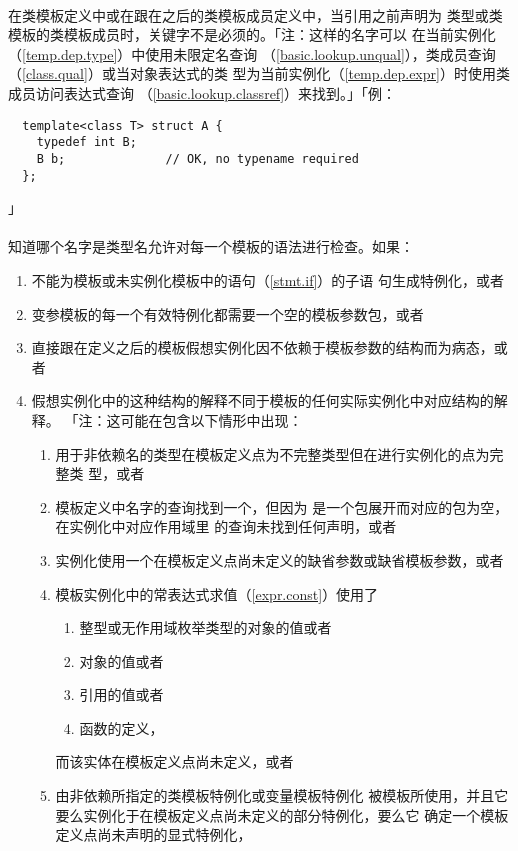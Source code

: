 \paragraph{}
在类模板定义中或在跟在之后的类模板成员定义中，当引用之前声明为
类型或类模板的类模板成员时，关键字不是必须的。「注：这样的名字可以
在当前实例化（\ref{temp.dep.type}）中使用未限定名查询
（\ref{basic.lookup.unqual}），类成员查询（\ref{class.qual}）或当对象表达式的类
型为当前实例化（\ref{temp.dep.expr}）时使用类成员访问表达式查询
（\ref{basic.lookup.classref}）来找到。」「例：
\begin{lstlisting}
  template<class T> struct A {
    typedef int B;
    B b;              // OK, no typename required
  };
\end{lstlisting}」

\paragraph{}
知道哪个名字是类型名允许对每一个模板的语法进行检查。如果：
\begin{enumerate}
  \item{不能为模板或未实例化模板中的语句（\ref{stmt.if}）的子语
    句生成特例化，或者}
  \item{变参模板的每一个有效特例化都需要一个空的模板参数包，或者}
  \item{直接跟在定义之后的模板假想实例化因不依赖于模板参数的结构而为病态，或者}
  \item{假想实例化中的这种结构的解释不同于模板的任何实际实例化中对应结构的解释。
    「注：这可能在包含以下情形中出现：
    \begin{enumerate}
      \item{用于非依赖名的类型在模板定义点为不完整类型但在进行实例化的点为完整类
        型，或者}
      \item{模板定义中名字的查询找到一个，但因为
        是一个包展开而对应的包为空，在实例化中对应作用域里
        的查询未找到任何声明，或者}
      \item{实例化使用一个在模板定义点尚未定义的缺省参数或缺省模板参数，或者}
      \item{模板实例化中的常表达式求值（\ref{expr.const}）使用了
        \begin{enumerate}
          \item{整型或无作用域枚举类型的对象的值或者}
          \item{对象的值或者}
          \item{引用的值或者}
          \item{函数的定义，}
        \end{enumerate}
        而该实体在模板定义点尚未定义，或者}
      \item{由非依赖所指定的类模板特例化或变量模板特例化
        被模板所使用，并且它要么实例化于在模板定义点尚未定义的部分特例化，要么它
        确定一个模板定义点尚未声明的显式特例化，}
    \end{enumerate}}
\end{enumerate}
